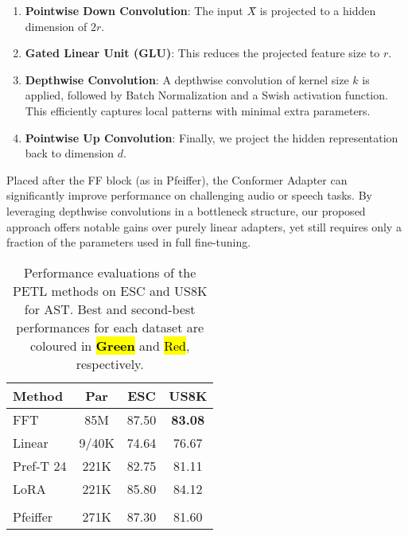 \documentclass[11pt]{article}
\begin{document}
\begin{enumerate}
    \item \textbf{Pointwise Down Convolution}: The input $X̂$ is projected to a hidden dimension of $2r$. 
    \item \textbf{Gated Linear Unit (GLU)}: This reduces the projected feature size to $r$.
    \item \textbf{Depthwise Convolution}: A depthwise convolution of kernel size $k$ is applied, followed by Batch Normalization and a Swish activation function. This efficiently captures local patterns with minimal extra parameters.
    \item \textbf{Pointwise Up Convolution}: Finally, we project the hidden representation back to dimension $d$.
\end{enumerate}

Placed after the FF block (as in Pfeiffer), the Conformer Adapter can significantly improve performance on challenging audio or speech tasks. By leveraging depthwise convolutions in a bottleneck structure, our proposed approach offers notable gains over purely linear adapters, yet still requires only a fraction of the parameters used in full fine-tuning.


\begingroup
\setlength{\tabcolsep}{3.3pt}

\begin{table}[t]
\centering
\caption{Performance evaluations of the PETL methods on ESC and US8K for AST. 
Best and second-best performances for each dataset are coloured in 
\hl{\textbf{Green}} and 
\hl{Red}, respectively.}
\label{tab:main}
\begin{tabular}{lKKK}
\toprule
\textbf{Method} & \textbf{Par} & \textbf{ESC} & \textbf{US8K}\\
\midrule
FFT &  85M & 87.50 & \textbf{83.08}\\
Linear     & 9/40K   & 74.64      & 76.67\\
\hline \addlinespace
Pref-T 24  & 221K    & 82.75      & 81.11\\ 
LoRA       & 221K    & 85.80      & 84.12\\
\hline
{}
\\
\hline \addlinespace
Pfeiffer   & 271K    & 87.30 & 81.60\\
\bottomrule
\end{tabular}
\end{table}
\endgroup
\end{document}
